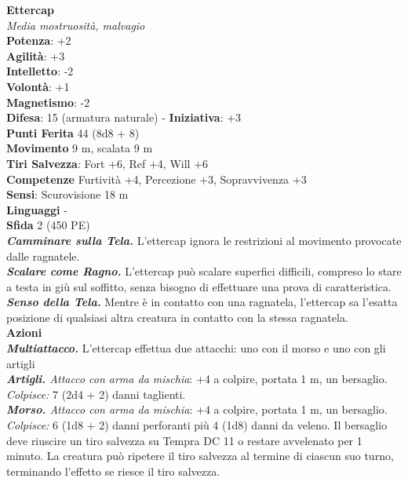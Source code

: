 \begin{multicols}{2}
\medskip\textbf{Ettercap}\\
\emph{Media mostruosità, malvagio}\\
\textbf{Potenza}: +2\\
\textbf{Agilità}: +3\\
\textbf{Intelletto}: -2\\
\textbf{Volontà}: +1\\
\textbf{Magnetismo}: -2\\
\textbf{Difesa}: 15 (armatura naturale) - \textbf{Iniziativa}: +3\\
\textbf{Punti Ferita} 44 (8d8 + 8)\\
\textbf{Movimento} 9 m, scalata 9 m\\
\textbf{Tiri Salvezza}: Fort +6, Ref +4, Will +6\\
\textbf{Competenze} Furtività +4, Percezione +3, Sopravvivenza +3\\
\textbf{Sensi}: Scurovisione 18 m\\
\textbf{Linguaggi} -\\
\textbf{Sfida} 2 (450 PE)\smallskip\\
\emph{\textbf{Camminare sulla Tela.}} L'ettercap ignora le restrizioni al movimento provocate dalle ragnatele.\\
\emph{\textbf{Scalare come Ragno.}} L'ettercap può scalare superfici difficili, compreso lo stare a testa in giù sul soffitto, senza bisogno di effettuare una prova di caratteristica.\\
\emph{\textbf{Senso della Tela.}} Mentre è in contatto con una ragnatela, l'ettercap sa l'esatta posizione di qualsiasi altra creatura in contatto con la stessa ragnatela.\\
\smallskip\textbf{Azioni}\\
\emph{\textbf{Multiattacco.}} L'ettercap effettua due attacchi: uno con il morso e uno con gli artigli\\
\emph{\textbf{Artigli.} Attacco con arma da mischia}: +4 a colpire, portata 1 m, un bersaglio.\\
\emph{Colpisce:} 7 (2d4 + 2) danni taglienti.\\
\emph{\textbf{Morso.} Attacco con arma da mischia}: +4 a colpire, portata 1 m, un bersaglio.\\
\emph{Colpisce:} 6 (1d8 + 2) danni perforanti più 4 (1d8) danni da veleno. Il bersaglio deve riuscire un tiro salvezza su Tempra DC 11 o restare avvelenato per 1 minuto. La creatura può ripetere il tiro salvezza al termine di ciascun suo turno, terminando l'effetto se riesce il tiro salvezza.\\

\end{multicols}
